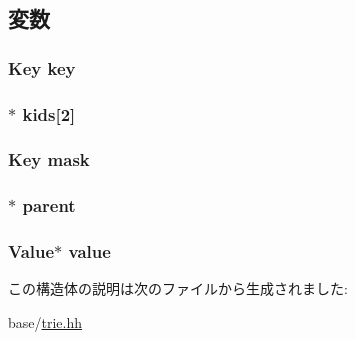 \subsection{変数}
\hypertarget{structTrie_1_1Node_a96313403719d705d2df812e3ba166772}{
\subsubsection[{key}]{\setlength{\rightskip}{0pt plus 5cm}Key {\bf key}}}
\label{structTrie_1_1Node_a96313403719d705d2df812e3ba166772}
\hypertarget{structTrie_1_1Node_a9351f8f627482f6964ee897bf446de87}{
\subsubsection[{kids}]{$\ast$ {\bf kids}\mbox{[}2\mbox{]}}}
\label{structTrie_1_1Node_a9351f8f627482f6964ee897bf446de87}
\hypertarget{structTrie_1_1Node_a5ca6e07c7cb150b1a672223c95c938aa}{
\subsubsection[{mask}]{\setlength{\rightskip}{0pt plus 5cm}Key {\bf mask}}}
\label{structTrie_1_1Node_a5ca6e07c7cb150b1a672223c95c938aa}
\hypertarget{structTrie_1_1Node_a15358e51f4bc699859aef344484ae4a8}{
\subsubsection[{parent}]{$\ast$ {\bf parent}}}
\label{structTrie_1_1Node_a15358e51f4bc699859aef344484ae4a8}
\hypertarget{structTrie_1_1Node_a7301da3d23cb556368f4a728d6e9b0ef}{
\subsubsection[{value}]{\setlength{\rightskip}{0pt plus 5cm}Value$\ast$ {\bf value}}}
\label{structTrie_1_1Node_a7301da3d23cb556368f4a728d6e9b0ef}


この構造体の説明は次のファイルから生成されました:\begin{DoxyCompactItemize}
\item 
base/\hyperlink{trie_8hh}{trie.hh}\end{DoxyCompactItemize}

